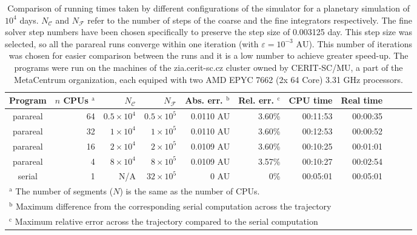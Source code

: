 \documentclass[conference]{IEEEtran}
\begin{document}
\begin{table*}[htbp]
\caption{Comparison of running times taken by different configurations of the simulator for a planetary simulation of $10^4$ days.
$N_\mathcal{C}$ and $N_\mathcal{F}$ refer to the number of steps of the coarse and the fine integrators respectively. The fine solver step numbers have been chosen specifically to preserve the step size of 0.003125 day. This step size was selected, so all the parareal runs converge within one iteration (with $\varepsilon = 10^{-3}\text{ AU}$). This number of iterations was chosen for easier comparison between the runs and it is a low number to achieve greater speed-up.
The programs were run on the machines of the zia.cerit-sc.cz cluster owned by CERIT-SC/MU, a part of the MetaCentrum organization, each equiped with two AMD EPYC 7662 (2x 64 Core) 3.31 GHz processors.}
\begin{center}
\begin{tabular}{crrrrrrrrcc}
\toprule
Program & $n$ CPUs $^{\mathrm{a}}$ & $N_\mathcal{C}$ & $N_\mathcal{F}$ & Abs. err. $^{\mathrm{b}}$ & Rel. err. $^{\mathrm{c}}$ & CPU time & Real time \\
\midrule
parareal & 64 & $0.5\times10^4$ &  $0.5\times10^5$ & 0.0110 AU & 3.60\% & 00:11:53 & 00:00:35 \\
parareal & 32 & $1\times10^4$ &  $1\times10^5$ & 0.0110 AU & 3.60\% & 00:12:53 & 00:00:52 \\
parareal & 16 & $2\times10^4$ &  $2\times10^5$ & 0.0109 AU & 3.60\% & 00:10:25 & 00:01:01 \\
parareal & 4 & $8\times10^4$ &  $8\times10^5$ & 0.0109 AU & 3.57\% & 00:10:27 & 00:02:54 \\
serial & 1 & N/A & $32\times10^5$ & 0 AU & 0\% & 00:05:01 & 00:05:01 \\
\bottomrule
\multicolumn{8}{l}{$^{\mathrm{a}}$ The number of segments ($N$) is the same as the number of CPUs.} \\
\multicolumn{8}{l}{$^{\mathrm{b}}$ Maximum difference from the corresponding serial computation across the trajectory} \\
\multicolumn{8}{l}{$^{\mathrm{c}}$ Maximum relative error across the trajectory compared to the serial computation}
\end{tabular}
\label{runtimes}
\end{center}
\end{table*}
\end{document}
